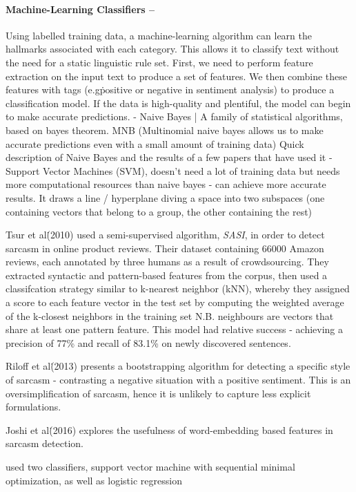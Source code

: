 \documentclass[12pt,a4paper]{article}
\begin{document}
\paragraph{Machine-Learning Classifiers --}
Using labelled training data, a machine-learning algorithm can learn the hallmarks associated with each category. This allows it to classify text without the need for a static linguistic rule set. First, we need to perform feature extraction on the input text to produce a set of features. We then combine these features with tags (e.g\. positive or negative in sentiment analysis) to produce a classification model. If the data is high-quality and plentiful, the model can begin to make accurate predictions.
- Naive Bayes | A family of statistical algorithms, based on bayes theorem. MNB (Multinomial naive bayes allows us to make accurate predictions even with a small amount of training data)
Quick description of Naive Bayes and the results of a few papers that have used it
- Support Vector Machines (SVM), doesn't need a lot of training data but needs more computational resources than naive bayes - can achieve more accurate results. It draws a line / hyperplane diving a space into two subspaces (one containing vectors that belong to a group, the other containing the rest)


Tsur et al\. (2010) \cite{tsur2010icwsm} used a semi-supervised algorithm, \textit{SASI}, in order to detect sarcasm in online product reviews. Their dataset containing 66000 Amazon reviews, each annotated by three humans as a result of crowdsourcing. They extracted syntactic and pattern-based features from the corpus, then used a classifcation strategy similar to k-nearest neighbor (kNN), whereby they assigned a score to each feature vector in the test set by computing the weighted average of the k-closest neighbors in the training set N.B. neighbours are vectors that share at least one pattern feature. This model had relative success - achieving a precision of 77\% and recall of 83.1\% on newly discovered sentences.

Riloff et al\. (2013) presents a bootstrapping algorithm for detecting a specific style of sarcasm - contrasting a negative situation with a positive sentiment. This is an oversimplification of sarcasm, hence it is unlikely to capture less explicit formulations.

Joshi et al\. (2016) explores the usefulness of word-embedding based features in sarcasm detection. 



\cite{gonzalez2011identifying} used two classifiers, support vector machine with sequential minimal optimization, as well as logistic regression
\end{document}
